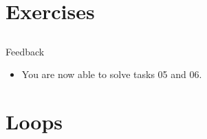\section{Exercises}
\subsection{}

\begin{frame}{Feedback}
	\begin{itemize}
		\item You are now able to solve tasks 05 and 06.
	\end{itemize}
\end{frame}
\section{Loops}
